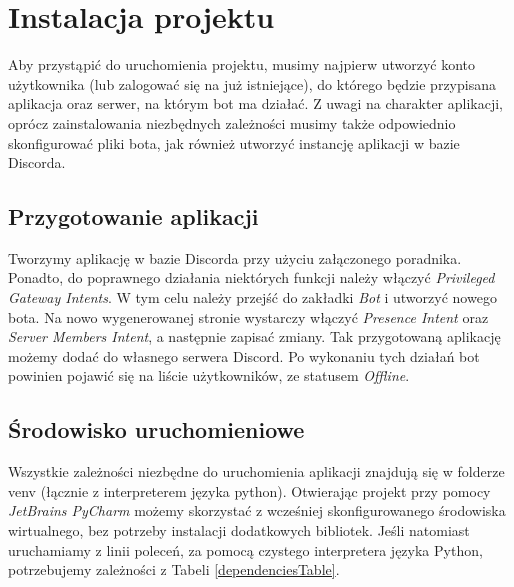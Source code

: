 \documentclass[shortabstract,inz]{iithesis}
\begin{document}
	\chapter{Instalacja projektu}
	Aby przystąpić do uruchomienia projektu, musimy najpierw utworzyć konto użytkownika (lub zalogować się na już istniejące), do którego będzie przypisana aplikacja oraz serwer, na którym bot ma działać.
	Z uwagi na charakter aplikacji, oprócz zainstalowania niezbędnych zależności musimy także odpowiednio skonfigurować pliki bota, jak również utworzyć instancję aplikacji w bazie Discorda.
	\section{Przygotowanie aplikacji}
	Tworzymy aplikację w bazie Discorda przy użyciu załączonego poradnika\cite{discorddev}. Ponadto, do poprawnego działania niektórych funkcji należy włączyć \textit{Privileged Gateway Intents}. W tym celu należy przejść do zakładki \textit{Bot} i utworzyć nowego bota. Na nowo wygenerowanej stronie wystarczy włączyć \textit{Presence Intent} oraz \textit{Server Members Intent}, a następnie zapisać zmiany. Tak przygotowaną aplikację możemy dodać do własnego serwera Discord\cite{discordserversetup}\cite{discorddev}. Po wykonaniu tych działań bot powinien pojawić się na liście użytkowników, ze statusem \textit{Offline}.
	
		\section{Środowisko uruchomieniowe}
	Wszystkie zależności niezbędne do uruchomienia aplikacji znajdują się w folderze venv (łącznie z interpreterem języka python). Otwierając projekt przy pomocy \textit{JetBrains PyCharm}\cite{jetbrainsPycharm} możemy skorzystać z wcześniej skonfigurowanego środowiska wirtualnego, bez potrzeby instalacji dodatkowych bibliotek. Jeśli natomiast uruchamiamy z linii poleceń, za pomocą czystego interpretera języka Python, potrzebujemy zależności z Tabeli \ref{dependenciesTable}.
	
\end{document}
